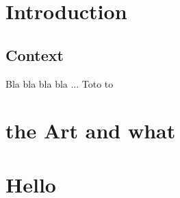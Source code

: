 \documentclass{paper}
\begin{document}
\section{Introduction}
\subsection{Context}
Bla bla bla bla ...
Toto to
\section{the Art and what}
\section{Hello}
\end{document}
